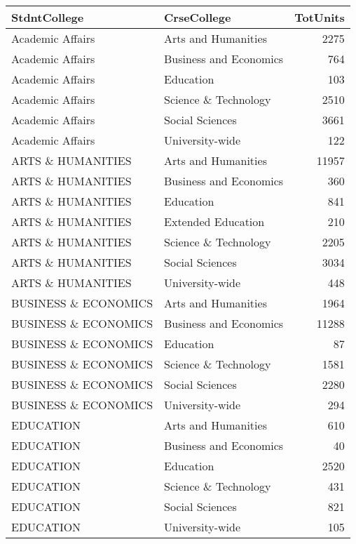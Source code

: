 \documentclass[]{article}
\begin{document}
\begin{table}[H]
\centering\begingroup\fontsize{10}{12}\selectfont

\begin{tabular}{l|l|r}
\hline
StdntCollege & CrseCollege & TotUnits\\
\hline
Academic Affairs & Arts and Humanities & 2275\\
\hline
Academic Affairs & Business and Economics & 764\\
\hline
Academic Affairs & Education & 103\\
\hline
Academic Affairs & Science \& Technology & 2510\\
\hline
Academic Affairs & Social Sciences & 3661\\
\hline
Academic Affairs & University-wide & 122\\
\hline
ARTS \& HUMANITIES & Arts and Humanities & 11957\\
\hline
ARTS \& HUMANITIES & Business and Economics & 360\\
\hline
ARTS \& HUMANITIES & Education & 841\\
\hline
ARTS \& HUMANITIES & Extended Education & 210\\
\hline
ARTS \& HUMANITIES & Science \& Technology & 2205\\
\hline
ARTS \& HUMANITIES & Social Sciences & 3034\\
\hline
ARTS \& HUMANITIES & University-wide & 448\\
\hline
BUSINESS \& ECONOMICS & Arts and Humanities & 1964\\
\hline
BUSINESS \& ECONOMICS & Business and Economics & 11288\\
\hline
BUSINESS \& ECONOMICS & Education & 87\\
\hline
BUSINESS \& ECONOMICS & Science \& Technology & 1581\\
\hline
BUSINESS \& ECONOMICS & Social Sciences & 2280\\
\hline
BUSINESS \& ECONOMICS & University-wide & 294\\
\hline
EDUCATION & Arts and Humanities & 610\\
\hline
EDUCATION & Business and Economics & 40\\
\hline
EDUCATION & Education & 2520\\
\hline
EDUCATION & Science \& Technology & 431\\
\hline
EDUCATION & Social Sciences & 821\\
\hline
EDUCATION & University-wide & 105\\

\end{tabular}
\end{table}
\end{document}
